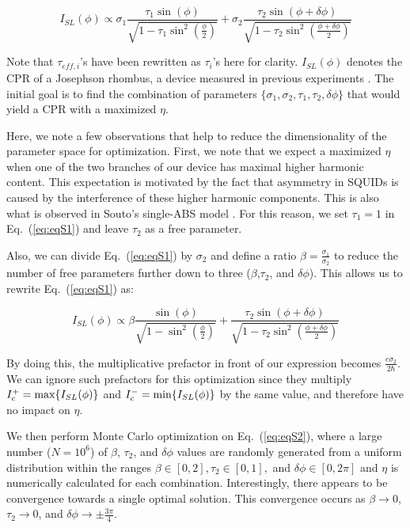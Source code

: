 \documentclass[%
 reprint,
 amsmath,amssymb,
 aps,
]{revtex4-2}
\begin{document}
\begin{equation}
    \label{eq:eqS1}
    I_{SL}(\phi) \propto \sigma_1\frac{\tau_1 \sin(\phi)}{\sqrt{1-\tau_{1} \sin^2(\frac{\phi}{2})}}+\sigma_2\frac{\tau_2 \sin(\phi+\delta \phi)}{\sqrt{1-\tau_{2} \sin^2(\frac{\phi+\delta \phi}{2})}}
\end{equation}

Note that $\tau_{eff,i}$'s have been rewritten as $\tau_i$'s here for clarity. $I_{SL}(\phi)$ denotes the CPR of a Josephson rhombus, a device measured in previous experiments \cite{Marcus2025}. The initial goal is to find the combination of parameters $\{\sigma_1,\sigma_2,\tau_1,\tau_2,\delta\phi\}$ that would yield a CPR with a maximized $\eta$.

Here, we note a few observations that help to reduce the dimensionality of the parameter space for optimization. First, we note that we expect a maximized $\eta$ when one of the two branches of our device has maximal higher harmonic content. This expectation is motivated by the fact that asymmetry in SQUIDs is caused by the interference of these higher harmonic components. This is also what is observed in Souto's single-ABS model \cite{Souto2022}. For this reason, we set $\tau_1=1$ in Eq.~(\ref{eq:eqS1}) and leave $\tau_2$ as a free parameter.

Also, we can divide Eq.~(\ref{eq:eqS1}) by $\sigma_2$ and define a ratio $\beta=\frac{\sigma_1}{\sigma_2}$ to reduce the number of free parameters further down to three ($\beta$,$\tau_2$, and $\delta\phi$). This allows us to rewrite Eq.~(\ref{eq:eqS1}) as:

\begin{equation}
    \label{eq:eqS2}
    I_{SL}(\phi) \propto \beta\frac{\sin(\phi)}{\sqrt{1- \sin^2(\frac{\phi}{2})}}+\frac{\tau_2 \sin(\phi+\delta \phi)}{\sqrt{1-\tau_{2} \sin^2(\frac{\phi+\delta \phi}{2})}}
\end{equation}

By doing this, the multiplicative prefactor in front of our expression becomes $\frac{e\sigma_2}{2\hbar}$. We can ignore such prefactors for this optimization since they multiply $I_c^+=\textnormal{max}\{I_{SL}(\phi)\}$ and $I_c^-=\textnormal{min}\{I_{SL}(\phi)\}$ by the same value, and therefore have no impact on $\eta$.

We then perform Monte Carlo optimization on Eq.~(\ref{eq:eqS2}), where a large number ($N=10^6$) of $\beta$, $\tau_2$, and $\delta\phi$ values are randomly generated from a uniform distribution within the ranges $\beta \in[0,2], \tau_2 \in[0,1],$ and $\delta\phi\in[0,2\pi]$ and $\eta$ is numerically calculated for each combination. Interestingly, there appears to be convergence towards a single optimal solution. This convergence occurs as $\beta\rightarrow0$, $\tau_2\rightarrow0$, and $\delta\phi\rightarrow\pm\frac{3\pi}{4}$.
\end{document}

